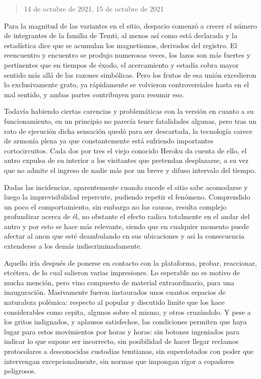 \documentclass[
]{book}
\begin{document}
\begin{quote}
14 de octubre de 2021, 15 de octubre de 2021
\end{quote}

Para la magnitud de las variantes en el sitio, despacio comenzó a crecer el número de integrantes de la familia de Temti, al menos así como está declarada y la estadística dice que se acumulan los magnetismos, derivados del registro. El reencuentro y encuentro se produjo numerosas veces, los lazos son más fuertes y pertinentes que en tiempos de éxodo, el acercamiento y estadía cobra mayor sentido más allá de las razones simbólicas. Pero los frutos de esa unión excedieron lo exclusivamente grato, ya rápidamente se volvieron controversiales hasta en el mal sentido, y ambas partes contribuyen para resumir eso.

Todavía habiendo ciertas carencias y problemáticas con la versión en cuanto a su funcionamiento, en un principio no parecía tener fatalidades algunas, pero tras un rato de ejecución dicha sensación quedó para ser descartada, la tecnología carece de armonía plena ya que constantemente está sufriendo importantes cortocircuitos. Cada dos por tres el viejo conocido Heroku da cuenta de ello, el antro expulsa de su interior a los visitantes que pretendan desplazarse, a su vez que no admite el ingreso de nadie más por un breve y difuso intervalo del tiempo.

Dadas las incidencias, aparentemente cuando sucede el sitio sabe acomodarse y luego la imprevisibilidad repercute, pudiendo repetir el fenómeno. Comprendido un poco el comportamiento, sin embargo no las causas, resulta complejo profundizar acerca de él, no obstante el efecto radica totalmente en el andar del antro y por esto se hace más relevante, siendo que en cualquier momento puede afectar al anon que esté deambulando en sus ubicaciones y así la consecuencia extenderse a los demás indiscriminadamente.

Aquello iría después de ponerse en contacto con la plataforma, probar, reaccionar, etcétera, de lo cual salieron varias impresiones. Lo esperable no es motivo de mucha mención, pero vino compuesto de material extraordinario, para una inauguración. Masivamente fueron instaurados unos cuantos espacios de naturaleza polémica: respecto al popular y discutido limite que los hace considerables como cepita, algunos sobre el mismo, y otros cruzándolo. Y pese a los gritos indignados, y aplausos satisfechos, las condiciones permiten que haya lugar para estos movimientos por horas y horas: sin botones ingeniados para indicar lo que supone ser incorrecto, sin posibilidad de hacer llegar reclamos protocolares a desconocidas custodias temtianas, sin superdotados con poder que intervengan excepcionalmente, sin normas que impongan rigor a copadores peligrosos.
\end{document}
